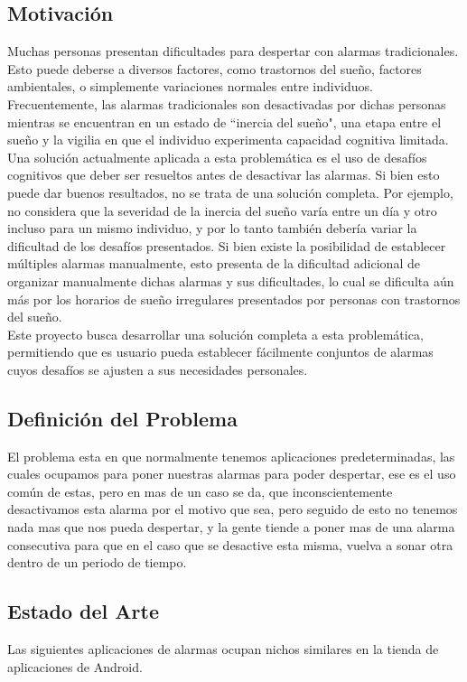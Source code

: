 \documentclass[letterpaper, 10pt]{article}
\begin{document}
\subsection{Motivación}
Muchas personas presentan dificultades para despertar con alarmas tradicionales. Esto puede deberse a diversos factores, como trastornos del sueño, factores ambientales, o simplemente variaciones normales entre individuos. Frecuentemente, las alarmas tradicionales son desactivadas por dichas personas mientras se encuentran en un estado de ``inercia del sueño", una etapa entre el sueño y la vigilia en que el individuo experimenta capacidad cognitiva limitada.
\\
Una solución actualmente aplicada a esta problemática es el uso de desafíos cognitivos que deber ser resueltos antes de desactivar las alarmas. Si bien esto puede dar buenos resultados, no se trata de una solución completa. Por ejemplo, no considera que la severidad de la inercia del sueño varía entre un día y otro incluso para un mismo individuo, y por lo tanto también debería variar la dificultad de los desafíos presentados. Si bien existe la posibilidad de establecer múltiples alarmas manualmente, esto presenta de la dificultad adicional de organizar manualmente dichas alarmas y sus dificultades, lo cual se dificulta aún más por los horarios de sueño irregulares presentados por personas con trastornos del sueño.
\\
Este proyecto busca desarrollar una solución completa a esta problemática, permitiendo que es usuario pueda establecer fácilmente conjuntos de alarmas cuyos desafíos se ajusten a sus necesidades personales.

\subsection{Definición del Problema}
El problema esta en que normalmente tenemos aplicaciones predeterminadas, las cuales ocupamos para poner nuestras alarmas para poder despertar, ese es el uso común de estas, pero en mas de un caso se da, que inconscientemente desactivamos esta alarma por el motivo que sea, pero seguido de esto no tenemos nada mas que nos pueda despertar, y la gente tiende a poner mas de una alarma consecutiva para que en el caso que se desactive esta misma, vuelva a sonar otra dentro de un periodo de tiempo.
\subsection{Estado del Arte}
	Las siguientes aplicaciones de alarmas ocupan nichos similares en la tienda de aplicaciones de Android.
\end{document}
